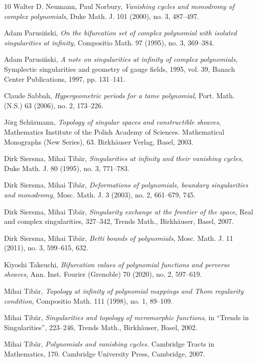 \documentclass[12pt,leqno,twoside]{amsart}
\theoremstyle{remark}
\theoremstyle{remark}
\theoremstyle{definition}
\theoremstyle{remark}
\theoremstyle{remark}
\theoremstyle{remark}
\numberwithin{equation}{section}  %
\begin{document}
\begin{thebibliography}{10}
  Walter D. Neumann, Paul Norbury,  {\it Vanishing cycles and monodromy of complex polynomials}, Duke Math. J. 101 (2000), no. 3, 487--497.

 Adam Parusi\'nski, 
{\it On the bifurcation set of complex polynomial with isolated singularities at infinity}, Compositio Math. 97 (1995), no. 3, 369--384.

 Adam Parusi\'nski, 
{\it A note on singularities at infinity of complex polynomials}, Symplectic singularities and geometry of gauge fields, 1995, vol. 39, Banach Center Publications, 1997, pp. 131--141.

 Claude Sabbah,  {\it Hypergeometric periods for a tame polynomial}, Port. Math. (N.S.) 63 (2006), no. 2, 173--226.

 J\"org Sch\"urmann, {\it Topology of singular spaces and constructible sheaves}, Mathematics Institute of the Polish Academy of Sciences. Mathematical Monographs (New Series), 63. Birkh\"auser Verlag, Basel, 2003.

 Dirk Siersma, Mihai Tib\u{a}r,  {\it Singularities at infinity and their vanishing cycles}, Duke Math. J. 80 (1995), no. 3, 771--783. 

 Dirk Siersma, Mihai Tib\u{a}r,  {\it 
Deformations of polynomials, boundary singularities and monodromy}, 
Mosc. Math. J. 3 (2003), no. 2, 661--679, 745.

 Dirk Siersma, Mihai Tib\u{a}r,  {\it 
Singularity exchange at the frontier of the space},  Real and complex singularities, 327--342, Trends Math., Birkh\"auser, Basel, 2007.

 Dirk Siersma, Mihai Tib\u{a}r,  {\it 
Betti bounds of polynomials}, 
Mosc. Math. J. 11 (2011), no. 3, 599--615, 632.

 Kiyoshi Takeuchi, {\it Bifurcation values of polynomial functions and perverse sheaves}, Ann. Inst. Fourier (Grenoble) 70 (2020), no. 2, 597--619.

  Mihai Tib\u{a}r, {\it Topology at infinity of polynomial mappings and Thom regularity condition}, Compositio Math. 111 (1998), no. 1, 89--109.

  Mihai Tib\u{a}r, {\it Singularities and topology of meromorphic functions},  in ``Trends in Singularities'',  223--246, Trends Math., Birkh\"auser, Basel, 2002.

  Mihai Tib\u{a}r, {\it Polynomials and vanishing cycles.} Cambridge Tracts in Mathematics, 170. Cambridge University Press, Cambridge, 2007.



\end{thebibliography}
\end{document}
